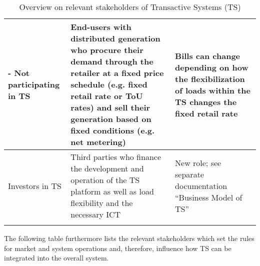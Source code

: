 \begin{longtable}{p{}p{}p{}}
\\  \hline
        - Not participating in TS &
End-users with distributed generation who procure their demand through the retailer at a fixed price schedule (e.g. fixed retail rate or ToU rates) and sell their generation based on fixed conditions (e.g. net metering) &
Bills can change depending on how the flexibilization of loads within the TS changes the fixed retail rate
\\  \hline
        Investors in TS &
Third parties who finance the development and operation of the TS platform as well as load flexibility and the necessary ICT &
New role; see separate documentation “Business Model of TS”
\\  \hline
    \caption{Overview on relevant stakeholders of Transactive Systems (TS)}
    \label{tab:stakeholders}
    \end{longtable}

The following table furthermore lists the relevant stakeholders which set the rules for market and system operations and, therefore, influence how TS can be integrated into the overall system.


